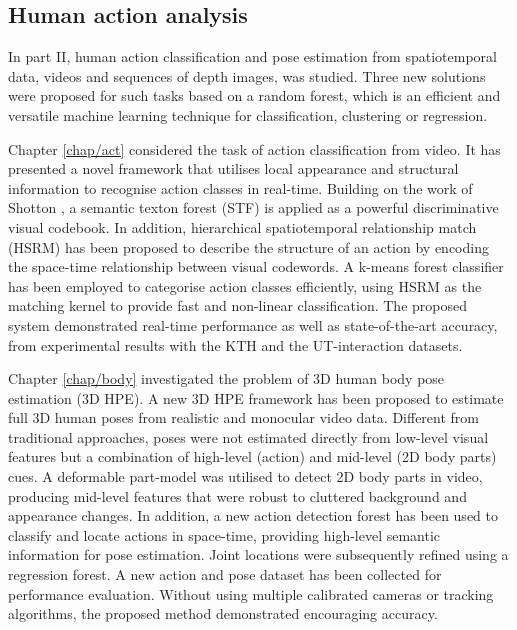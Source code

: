 \subsection{Human action analysis}

In part II, human action classification and pose estimation from spatiotemporal data, \eg videos and sequences of depth images, was studied. Three new solutions were proposed for such tasks based on a random forest, which is an efficient and versatile machine learning technique for classification, clustering or regression. 

Chapter \ref{chap/act} considered the task of action classification from video. It has presented a novel framework that utilises local appearance and structural information to recognise action classes in real-time. Building on the work of Shotton \etal \cite{Shotton2008}, a semantic texton forest (STF) is applied as a powerful discriminative visual codebook. In addition, hierarchical spatiotemporal relationship match (HSRM) has been proposed to describe the structure of an action by encoding the space-time relationship between visual codewords. A k-means forest classifier has been employed to categorise action classes efficiently, using HSRM as the matching kernel to provide fast and non-linear classification. The proposed system demonstrated real-time performance as well as state-of-the-art accuracy, from experimental results with the KTH and the UT-interaction datasets. 

Chapter \ref{chap/body} investigated the problem of 3D human body pose estimation (3D HPE).
A new 3D HPE framework has been proposed to estimate full 3D human poses from realistic and monocular video data. Different from traditional approaches, poses were not estimated directly from low-level visual features but a combination of high-level (action) and mid-level (2D body parts) cues. 
A deformable part-model was utilised to detect 2D body parts in video, producing mid-level features that were robust to cluttered background and appearance changes. In addition, a new action detection forest has been used to classify and locate actions in space-time, providing high-level semantic information for pose estimation. Joint locations were subsequently refined using a regression forest. A new action and pose dataset has been collected for performance evaluation. Without using multiple calibrated cameras or tracking algorithms, the proposed method demonstrated encouraging accuracy.

